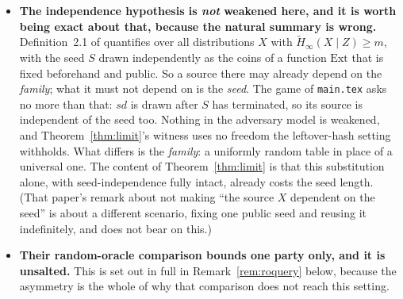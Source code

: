 \documentclass{aicr-solution}
\newcommand{\sd}{\mathit{sd}}
\begin{document}
\begin{itemize}
\item \textbf{The independence hypothesis is \emph{not} weakened here, and it is worth being exact
about that, because the natural summary is wrong.} Definition~2.1 of \cite{BDKPPSY11} quantifies
over all distributions $X$ with $\tilde H_\infty(X \mid Z) \ge m$, with the seed $S$ drawn
independently as the coins of a function $\mathrm{Ext}$ that is fixed beforehand and public. So a
source there may already depend on the \emph{family}; what it must not depend on is the
\emph{seed}. The game of \texttt{main.tex} asks no more than that: $\sd$ is drawn after $S$ has
terminated, so its source is independent of the seed too. Nothing in the adversary model is
weakened, and Theorem~\ref{thm:limit}'s witness uses no freedom the leftover-hash setting withholds.
What differs is the \emph{family}: a uniformly random table in place of a universal one. The
content of Theorem~\ref{thm:limit} is that this substitution alone, with seed-independence fully
intact, already costs the seed length. (That paper's remark about not making ``the source $X$
dependent on the seed'' is about a different scenario, fixing one public seed and reusing it
indefinitely, and does not bear on this.)

\item \textbf{Their random-oracle comparison bounds one party only, and it is unsalted.} This is
set out in full in Remark~\ref{rem:roquery} below, because the asymmetry is the whole of why that
comparison does not reach this setting.
\end{itemize}
\end{document}
